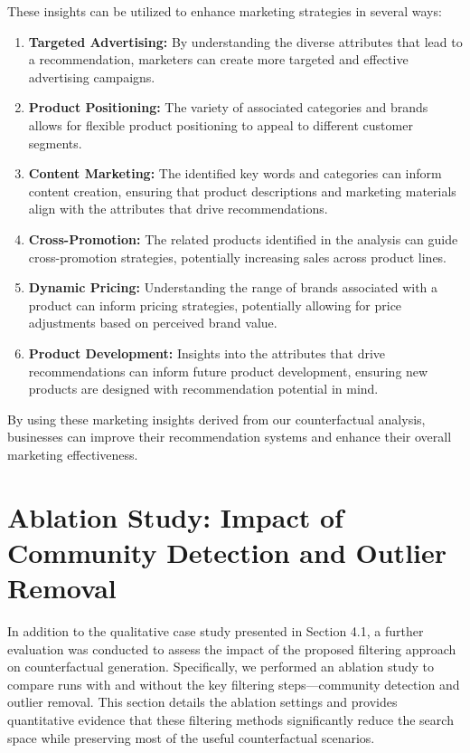 These insights can be utilized to enhance marketing strategies in several ways:
\begin{enumerate}
	\item \textbf{Targeted Advertising:} By understanding the diverse attributes
		that lead to a recommendation, marketers can create more targeted and effective
		advertising campaigns.

	\item \textbf{Product Positioning:} The variety of associated categories and
		brands allows for flexible product positioning to appeal to different
		customer segments.

	\item \textbf{Content Marketing:} The identified key words and categories can
		inform content creation, ensuring that product descriptions and marketing materials
		align with the attributes that drive recommendations.

	\item \textbf{Cross-Promotion:} The related products identified in the
		analysis can guide cross-promotion strategies, potentially increasing sales across
		product lines.

	\item \textbf{Dynamic Pricing:} Understanding the range of brands associated
		with a product can inform pricing strategies, potentially allowing for price
		adjustments based on perceived brand value.

	\item \textbf{Product Development:} Insights into the attributes that drive
		recommendations can inform future product development, ensuring new products
		are designed with recommendation potential in mind.
\end{enumerate}

By using these marketing insights derived from our counterfactual analysis,
businesses can improve their recommendation systems and enhance their overall
marketing effectiveness.

\section{Ablation Study: Impact of Community Detection and Outlier Removal}

In addition to the qualitative case study presented in Section 4.1, a further
evaluation was conducted to assess the impact of the proposed filtering approach
on counterfactual generation. Specifically, we performed an ablation study to
compare runs with and without the key filtering steps—community detection and
outlier removal. This section details the ablation settings and provides quantitative
evidence that these filtering methods significantly reduce the search space while
preserving most of the useful counterfactual scenarios.

